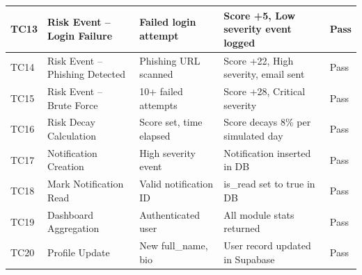 \begin{table}[h]
\begin{tabular}{|p{1cm}|p{3.5cm}|p{3.5cm}|p{4cm}|p{1.5cm}|}
TC13 & Risk Event -- Login Failure & Failed login attempt & Score +5, Low severity event logged & Pass \\
\hline

TC14 & Risk Event -- Phishing Detected & Phishing URL scanned & Score +22, High severity, email sent & Pass \\
\hline

TC15 & Risk Event -- Brute Force & 10+ failed attempts & Score +28, Critical severity & Pass \\
\hline

TC16 & Risk Decay Calculation & Score set, time elapsed & Score decays 8\% per simulated day & Pass \\
\hline

TC17 & Notification Creation & High severity event & Notification inserted in DB & Pass \\
\hline

TC18 & Mark Notification Read & Valid notification ID & is\_read set to true in DB & Pass \\
\hline

TC19 & Dashboard Aggregation & Authenticated user & All module stats returned & Pass \\
\hline

TC20 & Profile Update & New full\_name, bio & User record updated in Supabase & Pass \\
\hline

\end{tabular}
\end{table}

